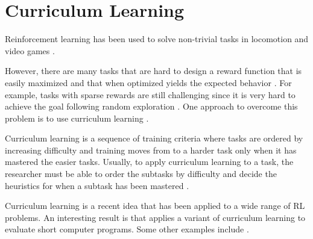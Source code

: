 \section{Curriculum Learning}

Reinforcement learning has been used to solve non-trivial tasks in locomotion \cite{TRPO} and video games \cite{RLNature2015}.

However, there are many tasks that are hard to design a reward function that is easily maximized and that when optimized yields the expected behavior \cite{ReverseCurrLearning}.
For example, tasks with sparse rewards are still challenging since it is very hard to achieve the goal following random exploration \cite{TSCurrLearning}.
One approach to overcome this problem is to use curriculum learning \cite{BengioCurrLearning}.

Curriculum learning is a sequence of training criteria where tasks are ordered by increasing difficulty and training
moves from to a harder task only when it has mastered the easier tasks. 
Usually, to apply curriculum learning to a task, the researcher must be able to order the subtasks by difficulty and 
decide the heuristics for when a subtask has been mastered \cite{TSCurrLearning}.

Curriculum learning is a recent idea that has been applied to a wide range of RL problems. An interesting
result is  that applies a variant of curriculum learning to evaluate short computer programs.
Some other examples include \cite{OpenAISelfPlay, TSCurrLearning}.
